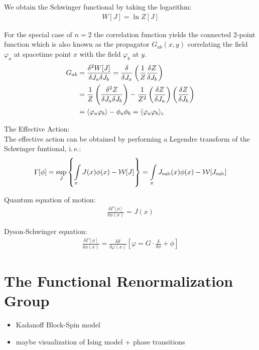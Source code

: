 We obtain the Schwinger functional by taking the logarithm:
\begin{align}
	W[J] = \ln Z[J]
\end{align}

For the special case of $n=2$ the correlation function yields the connected 2-point function which is also known as the propagator $G_{ab}(x,y)$ correlating the field $\varphi_a$ at spacetime point $x$ with the field $\varphi_b$ at $y$.
\begin{align}
	G_{ab} &= \frac{\delta^2W[J]}{\delta J_a\delta J_b} = \frac{\delta}{\delta J_a}\left(\frac{1}{Z}\frac{\delta Z}{\delta J_b}\right) \nonumber \\
				&= \frac{1}{Z}\left(\frac{\delta^2Z}{\delta J_a\delta J_b}\right) - \frac{1}{Z^2}\left(\frac{\delta Z}{\delta J_a}\right)\left(\frac{\delta Z}{\delta J_b}\right)\\
				&= \langle \varphi_a\varphi_b \rangle - \phi_a\phi_b = \langle \varphi_a\varphi_b \rangle_{\text{c}}	\nonumber	
\end{align}

The Effective Action:\\

The effective action can be obtained by performing a Legendre transform of the Schwinger funtional, i.\,e.:
\begin{align}
\Gamma[\phi] = \underset{J}{\operatorname{sup}}\left\{ \int\limits_x J(x)\phi(x) - \mathcal{W}[J] \right\} = \int\limits_x J_{\text{sub}}(x)\phi(x) - \mathcal{W}[J_{\text{sub}}]
\end{align}

Quantum equation of motion:
\begin{align}
\frac{\delta\Gamma[\phi]}{\delta\phi(x)} = J(x)	
\end{align}

Dyson-Schwinger equation:
\begin{align}
\frac{\delta\Gamma[\phi]}{\delta\phi(x)} = \frac{\delta\mathcal{S}}{\delta\varphi(x)} \left[\varphi = G \cdot \frac{\delta}{\delta\phi} + \phi \right]
\end{align}

\section{The Functional Renormalization Group}
\begin{itemize}
	\item Kadanoff Block-Spin model 
	\item maybe visualization of Ising model + phase transitions
\end{itemize}

